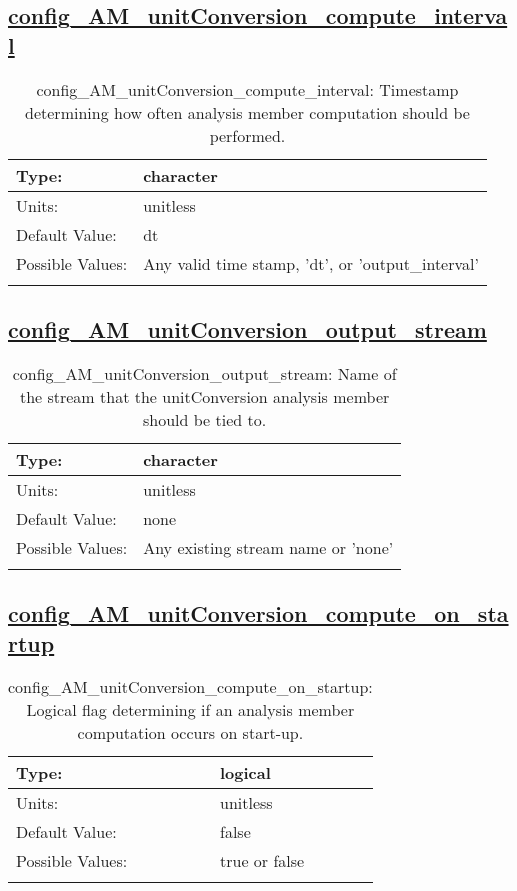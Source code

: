 \subsection[config\_AM\_unitConversion\_compute\_interval]{\hyperref[sec:nm_tab_AM_unitConversion]{config\_AM\_unitConversion\_compute\_interval}}
\label{subsec:nm_sec_config_AM_unitConversion_compute_interval}
\begin{center}
\begin{longtable}{| p{2.0in} || p{4.0in} |}
    \hline
    Type: & character \\
    \hline
    Units: & \si{unitless} \\
    \hline
    Default Value: & dt \\
    \hline
    Possible Values: & Any valid time stamp, 'dt', or 'output\_interval' \\
    \hline
    \caption{config\_AM\_unitConversion\_compute\_interval: Timestamp determining how often analysis member computation should be performed.}
\end{longtable}
\end{center}
\subsection[config\_AM\_unitConversion\_output\_stream]{\hyperref[sec:nm_tab_AM_unitConversion]{config\_AM\_unitConversion\_output\_stream}}
\label{subsec:nm_sec_config_AM_unitConversion_output_stream}
\begin{center}
\begin{longtable}{| p{2.0in} || p{4.0in} |}
    \hline
    Type: & character \\
    \hline
    Units: & \si{unitless} \\
    \hline
    Default Value: & none \\
    \hline
    Possible Values: & Any existing stream name or 'none' \\
    \hline
    \caption{config\_AM\_unitConversion\_output\_stream: Name of the stream that the unitConversion analysis member should be tied to.}
\end{longtable}
\end{center}
\subsection[config\_AM\_unitConversion\_compute\_on\_startup]{\hyperref[sec:nm_tab_AM_unitConversion]{config\_AM\_unitConversion\_compute\_on\_startup}}
\label{subsec:nm_sec_config_AM_unitConversion_compute_on_startup}
\begin{center}
\begin{longtable}{| p{2.0in} || p{4.0in} |}
    \hline
    Type: & logical \\
    \hline
    Units: & \si{unitless} \\
    \hline
    Default Value: & false \\
    \hline
    Possible Values: & true or false \\
    \hline
    \caption{config\_AM\_unitConversion\_compute\_on\_startup: Logical flag determining if an analysis member computation occurs on start-up.}
\end{longtable}
\end{center}
